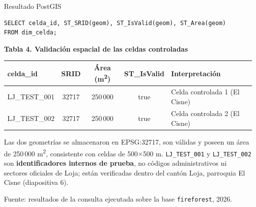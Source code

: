 \documentclass[aspectratio=169,11pt]{beamer}
\newcommand{\seccionactual}{Presentaci\'on}
\newcommand{\fuente}[1]{{\vfill\tiny\color{GrisTexto!70!black} Fuente: #1}}
\begin{document}
\renewcommand{\seccionactual}{III. Resultados preliminares}
\begin{frame}[fragile]{Resultado PostGIS}
  \centering

  \vspace{0.12cm}
  \begin{footnotesize}
  \begin{verbatim}
SELECT celda_id, ST_SRID(geom), ST_IsValid(geom), ST_Area(geom)
FROM dim_celda;
  \end{verbatim}
  \end{footnotesize}

  \vspace{0.05cm}
  \raggedright{\small\textbf{Tabla 4. Validaci\'on espacial de las celdas controladas}\par}
  \centering
  \begin{tabular}{@{}lccc l@{}}
  \toprule
  \textbf{celda\_id} & \textbf{SRID} & \textbf{\'Area (m\textsuperscript{2})} & \textbf{ST\_IsValid} & \textbf{Interpretaci\'on} \\
  \midrule
  LJ\_TEST\_001 & 32717 & 250\,000 & true & Celda controlada 1 (El Cisne) \\
  LJ\_TEST\_002 & 32717 & 250\,000 & true & Celda controlada 2 (El Cisne) \\
  \bottomrule
  \end{tabular}

  \vspace{0.1cm}
  {\footnotesize Las dos geometr\'ias se almacenaron en EPSG:32717, son v\'alidas y poseen un \'area de 250\,000 m\textsuperscript{2}, consistente con celdas de 500$\times$500 m. \texttt{LJ\_TEST\_001} y \texttt{LJ\_TEST\_002} son \textbf{identificadores internos de prueba}, no c\'odigos administrativos ni sectores oficiales de Loja; est\'an verificadas dentro del cant\'on Loja, parroquia El Cisne (diapositiva 6).\par}
  \vspace{0.08cm}
  \fuente{resultados de la consulta ejecutada sobre la base \texttt{fireforest}, 2026.}
\end{frame}
\end{document}
